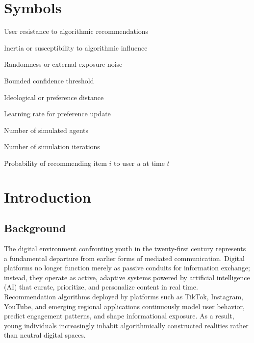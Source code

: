 \documentclass[12pt,a4paper]{report}
\begin{document}
\chapter*{Symbols}
\begin{description}[leftmargin=3cm, labelsep=1cm]
  \item[$\gamma$] User resistance to algorithmic recommendations
  \item[$\delta$] Inertia or susceptibility to algorithmic influence
  \item[$\eta$] Randomness or external exposure noise
  \item[$D$] Bounded confidence threshold
  \item[$d$] Ideological or preference distance
  \item[$\alpha$] Learning rate for preference update
  \item[$N$] Number of simulated agents
  \item[$T$] Number of simulation iterations
  \item[$P_t(i|u)$] Probability of recommending item $i$ to user $u$ at time $t$

\end{description}


\chapter{Introduction}

\setcounter{page}{1}
\pagestyle{fancy}


\section{Background}

The digital environment confronting youth in the twenty-first century represents a fundamental departure from earlier forms of mediated communication. Digital platforms no longer function merely as passive conduits for information exchange; instead, they operate as active, adaptive systems powered by artificial intelligence (AI) that curate, prioritize, and personalize content in real time. Recommendation algorithms deployed by platforms such as TikTok, Instagram, YouTube, and emerging regional applications continuously model user behavior, predict engagement patterns, and shape informational exposure. As a result, young individuals increasingly inhabit algorithmically constructed realities rather than neutral digital spaces.
\end{document}
